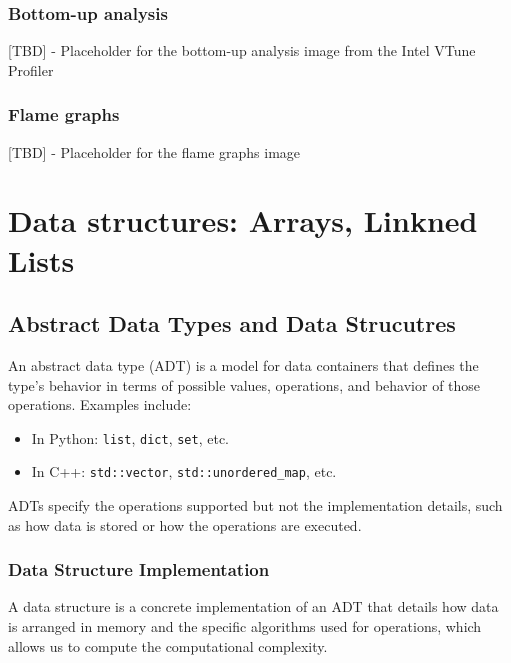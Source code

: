 \documentclass[12pt]{article}
\begin{document}
\subsubsection{Bottom-up analysis}
[TBD] - Placeholder for the bottom-up analysis image from the Intel VTune Profiler

\subsubsection{Flame graphs}
[TBD] - Placeholder for the flame graphs image






















\newpage
\section{Data structures: Arrays, Linkned Lists}

\subsection{Abstract Data Types and Data Strucutres}

An abstract data type (ADT) is a model for data containers that defines the type's behavior in terms of possible values, operations, and behavior of those operations. Examples include:

\begin{itemize}
    \item In Python: \texttt{list}, \texttt{dict}, \texttt{set}, etc.
    \item In C++: \texttt{std::vector}, \texttt{std::unordered\_map}, etc.
\end{itemize}

ADTs specify the operations supported but not the implementation details, such as how data is stored or how the operations are executed.

\subsubsection{Data Structure Implementation}
A data structure is a concrete implementation of an ADT that details how data is arranged in memory and the specific algorithms used for operations, which allows us to compute the computational complexity.
\end{document}
